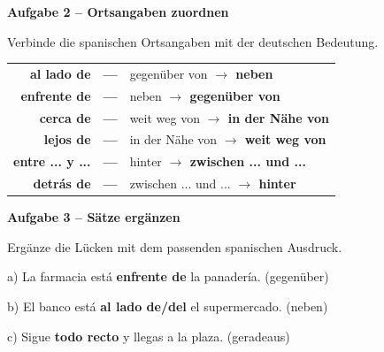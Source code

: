 \documentclass[11pt, a4paper]{article}
\newcommand{\fachfarbe}{spanisch}
\newcommand{\punktebox}[1]{\hfill\fbox{\small \_\_\_/#1}}
\newcommand{\lsg}[1]{\textcolor{loesung}{\textbf{#1}}}
\newenvironment{aufgabe}[1]{%
    \needspace{5\baselineskip}%
    \nopagebreak[4]%
    \vspace{10pt}
    \noindent\textbf{\textcolor{\fachfarbe}{Aufgabe #1}}
    \nopagebreak[4]%
    \vspace{5pt}
    \nopagebreak[4]%
    \begin{list}{}{\leftmargin=0pt}
    \item[]
}{%
    \end{list}
}
\newcommand{\es}[1]{\textcolor{\fachfarbe}{\textbf{#1}}}
\begin{document}
\vspace{15pt}


\begin{aufgabe}{2 -- Ortsangaben zuordnen}
Verbinde die spanischen Ortsangaben mit der deutschen Bedeutung. \punktebox{6}
\end{aufgabe}

\begin{center}
\begin{tabular}{rcl}
\es{al lado de} & \lsg{---} & gegenüber von \lsg{$\rightarrow$ neben} \\[0.8em]
\es{enfrente de} & \lsg{---} & neben \lsg{$\rightarrow$ gegenüber von} \\[0.8em]
\es{cerca de} & \lsg{---} & weit weg von \lsg{$\rightarrow$ in der Nähe von} \\[0.8em]
\es{lejos de} & \lsg{---} & in der Nähe von \lsg{$\rightarrow$ weit weg von} \\[0.8em]
\es{entre ... y ...} & \lsg{---} & hinter \lsg{$\rightarrow$ zwischen ... und ...} \\[0.8em]
\es{detrás de} & \lsg{---} & zwischen ... und ... \lsg{$\rightarrow$ hinter} \\
\end{tabular}
\end{center}

\vspace{15pt}


\begin{aufgabe}{3 -- Sätze ergänzen}
Ergänze die Lücken mit dem passenden spanischen Ausdruck. \punktebox{8}
\end{aufgabe}

\noindent
a) La farmacia está \lsg{enfrente de} la panadería. (gegenüber)

\vspace{0.8em}

\noindent
b) El banco está \lsg{al lado de/del} el supermercado. (neben)

\vspace{0.8em}

\noindent
c) Sigue \lsg{todo recto} y llegas a la plaza. (geradeaus)
\end{document}
